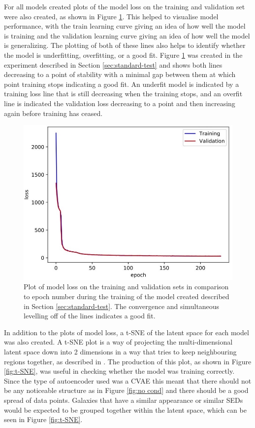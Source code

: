 \documentclass[fleqn,usenatbib]{mnras}
\begin{document}
For all models created plots of the model loss on the training and validation set were also created, as shown in Figure \ref{fig:model_loss}. This helped to visualise model performance, with the train learning curve giving an idea of how well the model is training and the validation learning curve giving an idea of how well the model is generalizing. The plotting of both of these lines also helps to identify whether the model is underfitting, overfitting, or a good fit. Figure \ref{fig:model_loss} was created in the experiment described in Section \ref{sec:standard-test} and shows both lines decreasing to a point of stability with a minimal gap between them at which point training stops indicating a good fit. An underfit model is indicated by a training loss line that is still decreasing when the training stops, and an overfit line is indicated the validation loss decreasing to a point and then increasing again before training has ceased.

\begin{figure}
	\includegraphics[width=\columnwidth]{Figures/model_loss.jpg}
    \caption{Plot of model loss on the training and validation sets in comparison to epoch number during the training of the model created described in Section \ref{sec:standard-test}. The convergence and simultaneous levelling off of the lines indicates a good fit.}
    \label{fig:model_loss}
\end{figure}

In addition to the plots of model loss, a t-SNE of the latent space for each model was also created. A t-SNE plot is a way of projecting the multi-dimensional latent space down into 2 dimensions in a way that tries to keep neighbouring regions together, as described in \citet{Maaten2008}. The production of this plot, as shown in Figure \ref{fig:t-SNE}, was useful in checking whether the model was training correctly. Since the type of autoencoder used was a CVAE this meant that there should not be any noticeable structure as in Figure \ref{fig:no cond} and there should be a good spread of data points. Galaxies that have a similar appearance or similar SEDs would be expected to be grouped together within the latent space, which can be seen in Figure \ref{fig:t-SNE}.
\end{document}
